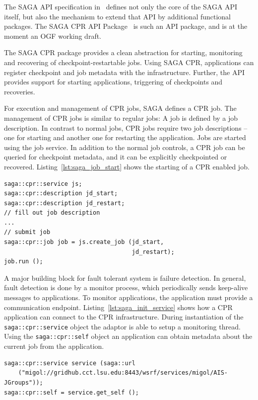 \documentclass[times, 10pt,twocolumn]{article}
\begin{document}

The SAGA API specification in~\cite{saga_gfd90} defines not only the
core of the SAGA API itself, but also the mechanism to extend that API
by additional functional packages.  The SAGA CPR API
Package~\cite{saga_cpr_draft} is such an API package, and is at the
moment an OGF working draft.

The SAGA CPR package provides a clean abstraction for starting,
monitoring and recovering of checkpoint-restartable jobs.
Using SAGA CPR, applications can register checkpoint and job metadata with the infrastructure. 
Further, the API provides support for starting applications, triggering of checkpoints and recoveries.

For execution and management of CPR jobs, SAGA defines a CPR job. The management of 
CPR jobs is similar to regular jobs: A job is defined by a job description. In contrast to normal jobs, 
CPR jobs require  two job descriptions -- one for starting and another one for restarting the application.
Jobs are started using the job service. In addition to the normal job controls, a CPR job can be queried for checkpoint metadata, and 
it can be explicitly checkpointed or recovered. Listing~\ref{lst:saga_job_start} shows the starting of a CPR enabled job.

\begin{lstlisting}[style=myListing, caption={SAGA CPR: Starting a Job with CPR Support},  label={lst:saga_job_start}]
saga::cpr::service js; 
saga::cpr::description jd_start;
saga::cpr::description jd_restart;
// fill out job description
...
// submit job  
saga::cpr::job job = js.create_job (jd_start, 
                                    jd_restart);
job.run ();
\end{lstlisting}
    
A major building block for fault tolerant system is failure detection. In general, fault detection is done by a monitor process, 
which periodically sends keep-alive messages to applications. To monitor applications, the application must provide a communication endpoint.
Listing~\ref{lst:saga_init_service} shows how a CPR application can connect to the CPR infrastructure. During instantiation of the \texttt{saga::cpr::service} object the adaptor is able to setup a monitoring thread. Using the \texttt{saga::cpr::self} object an application can obtain metadata about the current job from the application.                                                                               
\begin{lstlisting}[style=myListing, caption={SAGA CPR: Initialize Migol Session}, label={lst:saga_init_service}]
saga::cpr::service service (saga::url 
    ("migol://gridhub.cct.lsu.edu:8443/wsrf/services/migol/AIS-JGroups"));
saga::cpr::self = service.get_self ();
\end{lstlisting}
      
\end{document}
